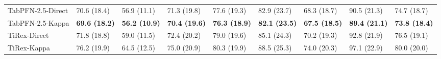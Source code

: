 {\begin{tabular}{lllllllll}
TabPFN-2.5-Direct & 70.6 (18.4) & 56.9 (11.1) & 71.3 (19.8) & 77.6 (19.3) & 82.9 (23.7) & 68.3 (18.7) & 90.5 (21.3) & 74.7 (18.7) \\
TabPFN-2.5-Kappa & \textbf{69.6 (18.2)} & \textbf{56.2 (10.9)} & \textbf{70.4 (19.6)} & \textbf{76.3 (18.9)} & \textbf{82.1 (23.5)} & \textbf{67.5 (18.5)} & \textbf{89.4 (21.1)} & \textbf{73.8 (18.4)} \\
TiRex-Direct & 71.8 (18.8) & 59.0 (11.5) & 72.4 (20.2) & 79.0 (19.6) & 85.1 (24.3) & 70.2 (19.3) & 92.8 (21.9) & 76.5 (19.1) \\
TiRex-Kappa & 76.2 (19.9) & 64.5 (12.5) & 75.0 (20.9) & 80.3 (19.9) & 88.5 (25.3) & 74.0 (20.3) & 97.1 (22.9) & 80.0 (20.0) \\
\bottomrule
\end{tabular}

\vspace{1cm}

}
